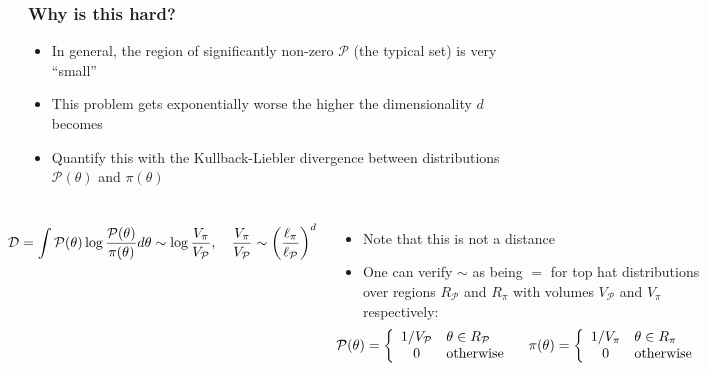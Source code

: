 \documentclass[aspectratio=169]{beamer}
\begin{document}
\begin{frame}
    \frametitle{Why is this hard?}
    \begin{itemize}
        \item In general, the region of significantly non-zero $\mathcal{P}$ (the typical set) is very ``small''
        \item This problem gets exponentially worse the higher the dimensionality $d$ becomes

        \item Quantify this with the Kullback-Liebler divergence between distributions $\mathcal{P}(\theta)$ and $\pi(\theta)$
    \end{itemize}
    \begin{columns}[onlytextwidth]
        \vspace{-5pt}
        \[
        \hspace{-15pt}
        \mathcal{D} = \int \mathcal{P}(\theta) \log\frac{\mathcal{P}(\theta)}{\pi(\theta)} d\theta \sim \log \frac{V_\pi}{V_\mathcal{P}}, \quad \frac{V_\pi}{V_\mathcal{P}} \sim {\left(\frac{\ell_\mathcal{\pi}}{\ell_\mathcal{P}}\right)}^d \]
        \vspace{-10pt}
        \begin{itemize}
            \item Note that this is \alert{not} a distance
            \item One can verify $\sim$ as being $=$ for top hat distributions over regions $R_\mathcal{P}$  and $R_\mathcal{\pi}$ with volumes $V_\mathcal{P}$ and $V_\mathcal{\pi}$ respectively:
                \[\hspace{-20pt}
                    \mathcal{P}(\theta) = \left\{
                        \begin{array}{cl}
                            1/V_\mathcal{P} & \theta \in R_\mathcal{P}\\
                            0 & \text{otherwise}\\
                        \end{array}
                    \right.
                    \quad
                    \pi(\theta) = \left\{
                        \begin{array}{cl}
                            1/V_\pi & \theta \in R_\pi\\
                            0 & \text{otherwise}\\
                        \end{array}
                    \right.
\]
\end{itemize}
\end{columns}
\end{frame}
\end{document}
